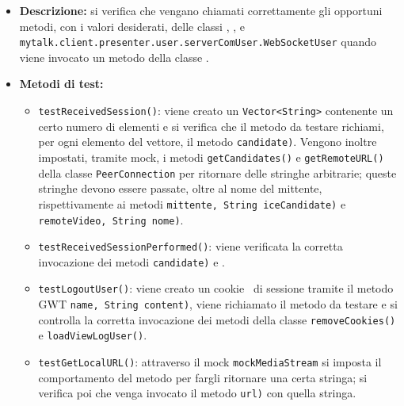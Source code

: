{\begin{sloppypar}
{\begin{itemize}
\begin{itemize}
					\item[] \textbf{Descrizione:} si verifica che vengano chiamati correttamente gli opportuni metodi, con i valori desiderati, delle classi , ,  e \texttt{mytalk.client.presenter.user.serverComUser.WebSocketUser} quando viene invocato un metodo della classe .
					
					\item[] \textbf{Metodi di test:}
					\begin{itemize}
						\item \texttt{testReceivedSession()}: viene creato un \texttt{Vector<String>} contenente un certo numero di elementi e si verifica che il metodo da testare richiami, per ogni elemento del vettore, il metodo  \texttt{candidate)}. Vengono inoltre impostati, tramite mock, i metodi \texttt{getCandidates()} e \texttt{getRemoteURL()} della classe \texttt{PeerConnection} per ritornare delle stringhe arbitrarie; queste stringhe devono essere passate, oltre al nome del mittente, rispettivamente ai metodi  \texttt{mittente, String iceCandidate)} e  \texttt{remoteVideo, String nome)}.
						
						\item \texttt{testReceivedSessionPerformed()}: viene verificata la corretta invocazione dei metodi  \texttt{candidate)} e .
						
						\item \texttt{testLogoutUser()}: viene creato un cookie\g~ di sessione tramite il metodo GWT  \texttt{name, String content)}, viene richiamato il metodo da testare e si controlla la corretta invocazione dei metodi della classe  \texttt{removeCookies()} e \texttt{loadViewLogUser()}.
						
						\item \texttt{testGetLocalURL()}: attraverso il mock \texttt{mockMediaStream} si imposta il comportamento del metodo  per fargli ritornare una certa stringa; si verifica poi che venga invocato il metodo  \texttt{url)} con quella stringa.
						

\end{itemize}
\end{itemize}
\end{itemize}}
\end{sloppypar}}
